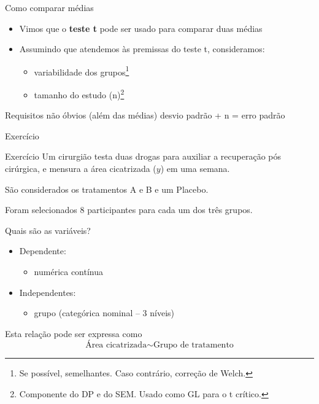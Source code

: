 \documentclass{beamer}
\begin{document}
\begin{frame}[label=requisito]{Como comparar médias}
  \begin{itemize}
    \footnotesize
  \item Vimos que o {\bf teste t} pode ser usado para comparar duas médias
    \bigskip
  \item Assumindo que atendemos às premissas do teste t, consideramos:
    \begin{itemize}
      \footnotesize
    \item variabilidade dos grupos\footnote{\scriptsize Se possível, semelhantes. Caso contrário, correção de Welch.}
    \item tamanho do estudo (n)\footnote{\scriptsize Componente do DP e do SEM. Usado como GL para o t crítico.}
    \end{itemize}
  \end{itemize}
  \bigskip
  \begin{block}{Requisitos não óbvios (além das médias)}
    desvio padrão + n = erro padrão
  \end{block}
\end{frame}

\begin{frame}[label=exercicio-enunciado]{\small Exercício}
  \begin{exampleblock}{Exercício}
    \footnotesize
    Um cirurgião testa duas drogas para auxiliar a recuperação pós cirúrgica, e mensura a área cicatrizada ($y$) em uma semana.

    \bigskip
    São considerados os tratamentos A e B e um Placebo.

    \bigskip
    Foram selecionados 8 participantes para cada um dos três grupos.
  \end{exampleblock}
\end{frame}

\begin{frame}{Quais são as variáveis?}
  \begin{itemize}
    \small
  \item Dependente:
    \begin{itemize}
      \footnotesize
    \item numérica contínua
    \end{itemize}
  \item Independentes:
    \begin{itemize}
      \footnotesize
    \item grupo (categórica nominal -- 3 níveis)
    \end{itemize}
  \end{itemize}
  \vfill
  \begin{block}{Esta relação pode ser expressa como}
    \begin{displaymath}
      \text{Área cicatrizada} \sim \text{Grupo de tratamento}
    \end{displaymath}
  \end{block}
\end{frame}
\end{document}
